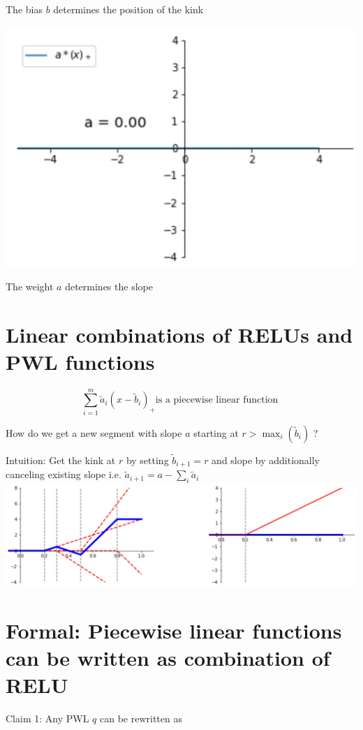 \documentclass[10pt]{article}
\begin{document}
The bias $b$ determines the position of the kink

\begin{center}
\includegraphics[max width=\textwidth]{2024_01_08_0e0dcffe4bc8c6049046g-33}
\end{center}

The weight $a$ determines the slope

\section*{Linear combinations of RELUs and PWL functions}
$$
\sum_{i=1}^{m} \tilde{a}_{i}\left(x-\tilde{b}_{i}\right)_{+} \text {is a piecewise linear function }
$$

How do we get a new segment with slope $a$ starting at $r>\max _{i}\left(\tilde{b}_{i}\right)$ ?

Intuition: Get the kink at $r$ by setting $\tilde{b}_{i+1}=r$ and slope by additionally canceling existing slope i.e. $\tilde{a}_{i+1}=a-\sum_{i} \tilde{a}_{i}$
\includegraphics[max width=\textwidth, center]{2024_01_08_0e0dcffe4bc8c6049046g-34}

\section*{Formal: Piecewise linear functions can be written as combination of RELU}
Claim 1: Any PWL $q$ can be rewritten as
\end{document}
